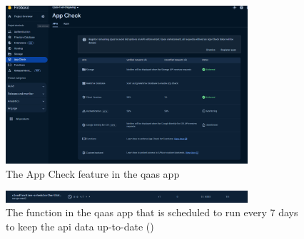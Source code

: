 \begin{figure}[htbp]
      \centering
      \includegraphics[width=0.8\textwidth]{Figures/Firebase/App Check.png}
      \caption{The App Check feature in the \acrshort{qaas} app}
\end{figure}

\begin{figure}[htbp]
      \centering
      \includegraphics[width=0.8\textwidth]{Figures/Firebase/Functions/CronJobs.png}
      \caption{The function in the \acrshort{qaas} app that is scheduled to run every 7 days to keep the \acrshort{api} data up-to-date
            (\textit{\cite{cronJobQaaSAppFunction}})}
\end{figure}


